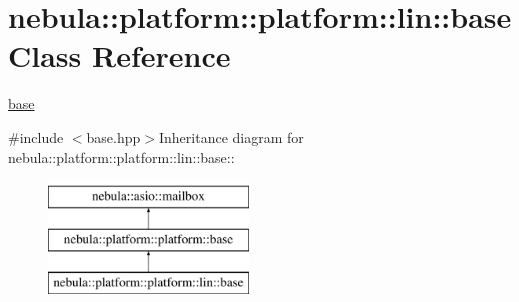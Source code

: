\hypertarget{classnebula_1_1platform_1_1platform_1_1lin_1_1base}{
\section{nebula::platform::platform::lin::base Class Reference}
\label{classnebula_1_1platform_1_1platform_1_1lin_1_1base}
}


\hyperlink{classnebula_1_1platform_1_1platform_1_1lin_1_1base}{base}  


{\ttfamily \#include $<$base.hpp$>$}Inheritance diagram for nebula::platform::platform::lin::base::\begin{figure}[H]
\begin{center}
\leavevmode
\includegraphics[height=3cm]{classnebula_1_1platform_1_1platform_1_1lin_1_1base}
\end{center}
\end{figure}
